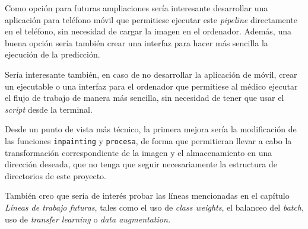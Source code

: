 Como opción para futuras ampliaciones sería interesante desarrollar una aplicación para teléfono móvil que permitiese ejecutar este \textit{pipeline} directamente en el teléfono, sin necesidad de cargar la imagen en el ordenador. Además, una buena opción sería también crear una interfaz para hacer más sencilla la ejecución de la predicción.

Sería interesante también, en caso de no desarrollar la aplicación de móvil, crear un ejecutable o una interfaz para el ordenador que permitiese al médico ejecutar el flujo de trabajo de manera más sencilla, sin necesidad de tener que usar el \textit{script} desde la terminal.

Desde un punto de vista más técnico, la primera mejora sería la modificación de las funciones \texttt{inpainting} y \texttt{procesa}, de forma que permitieran llevar a cabo la transformación correspondiente de la imagen y el almacenamiento en una dirección deseada, que no tenga que seguir necesariamente la estructura de directorios de este proyecto. 

También creo que sería de interés probar las líneas mencionadas en el capítulo \textit{Líneas de trabajo futuras}, tales como el uso de \textit{class weights}, el balanceo del \textit{batch}, uso de \textit{transfer learning} o \textit{data augmentation.}